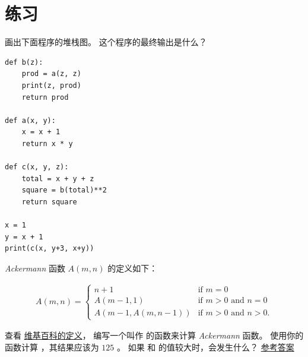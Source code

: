 \section{练习}

\begin{exercise}


画出下面程序的堆栈图。
这个程序的最终输出是什么？
  

\begin{em}
\begin{lstlisting}
def b(z):
    prod = a(z, z)
    print(z, prod)
    return prod

def a(x, y):
    x = x + 1
    return x * y

def c(x, y, z):
    total = x + y + z
    square = b(total)**2
    return square

x = 1
y = x + 1
print(c(x, y+3, x+y))
\end{lstlisting}
\end{em}

\end{exercise}


\begin{exercise}
\label{ackermann}


{\em Ackermann} 函数 $A(m, n)$ 的定义如下：

\begin{eqnarray*}
A(m, n) = \begin{cases}
              n+1 & \mbox{if } m = 0 \\
        A(m-1, 1) & \mbox{if } m > 0 \mbox{ and } n = 0 \\
A(m-1, A(m, n-1)) & \mbox{if } m > 0 \mbox{ and } n > 0.
\end{cases}
\end{eqnarray*}

%

查看 \href{http://en.wikipedia.org/wiki/Ackermann_function}{维基百科的定义}，
编写一个叫作 {\em {}} 的函数来计算 {\em Ackermann} 函数。
使用你的函数计算 {\em {}}，其结果应该为 $125$ 。
如果 {\em {}} 和 {\em {}} 的值较大时，会发生什么？
\href{http://thinkpython2.com/code/ackermann.py}{参考答案}

  
  
\end{exercise}


